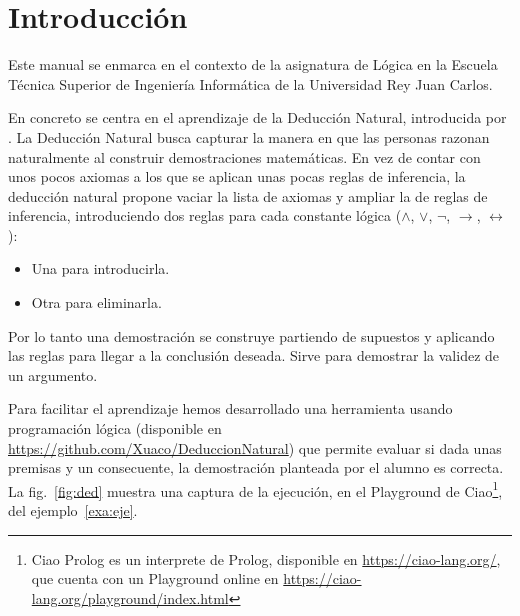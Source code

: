 \documentclass[12pt, a4paper]{urjc}
\begin{document}
\maketitle

\section{Introducción}

Este manual se enmarca en el contexto de la asignatura de Lógica en la
Escuela Técnica Superior de Ingeniería Informática de la Universidad
Rey Juan Carlos.

En concreto se centra en el aprendizaje de la Deducción Natural,
introducida por \citet{gentzen1935untersuchungen}.
%
La Deducción Natural busca capturar la manera en que las personas
razonan naturalmente al construir demostraciones matemáticas.
% 
En vez de contar con unos pocos axiomas a los que se aplican unas
pocas reglas de inferencia, la deducción natural propone vaciar la
lista de axiomas y ampliar la de reglas de inferencia, introduciendo
dos reglas para cada constante lógica ($\land$, $\lor$, $\lnot$,
$\rightarrow$, $\leftrightarrow$):
\begin{itemize}
\item Una para introducirla.
\item Otra para eliminarla.
\end{itemize}
Por lo tanto una demostración se construye partiendo de supuestos y
aplicando las reglas para llegar a la conclusión deseada.
%
Sirve para demostrar la validez de un argumento.

Para facilitar el aprendizaje hemos desarrollado una herramienta
usando programación lógica (disponible en
\url{https://github.com/Xuaco/DeduccionNatural}) que permite evaluar
si dada unas premisas y un consecuente, la demostración planteada por
el alumno es correcta. La fig.~\ref{fig:ded} muestra una captura de la
ejecución, en el Playground de Ciao\footnote{Ciao Prolog es un
  interprete de Prolog, disponible en \url{https://ciao-lang.org/},
  que cuenta con un Playground online en
  \url{https://ciao-lang.org/playground/index.html}}, del 
ejemplo~\ref{exa:eje}.
\end{document}
